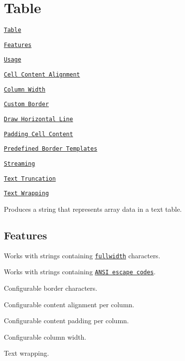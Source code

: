 \section*{Table}

\href{https://travis-ci.org/gajus/table}{\tt } \href{https://www.npmjs.com/package/table}{\tt } \href{https://github.com/gajus/canonical}{\tt }


\begin{DoxyItemize}
\item \href{#table}{\tt Table}
\begin{DoxyItemize}
\item \href{#table-features}{\tt Features}
\item \href{#table-usage}{\tt Usage}
\begin{DoxyItemize}
\item \href{#table-usage-cell-content-alignment}{\tt Cell Content Alignment}
\item \href{#table-usage-column-width}{\tt Column Width}
\item \href{#table-usage-custom-border}{\tt Custom Border}
\item \href{#table-usage-draw-horizontal-line}{\tt Draw Horizontal Line}
\item \href{#table-usage-padding-cell-content}{\tt Padding Cell Content}
\item \href{#table-usage-predefined-border-templates}{\tt Predefined Border Templates}
\item \href{#table-usage-streaming}{\tt Streaming}
\item \href{#table-usage-text-truncation}{\tt Text Truncation}
\item \href{#table-usage-text-wrapping}{\tt Text Wrapping}
\end{DoxyItemize}
\end{DoxyItemize}
\end{DoxyItemize}

Produces a string that represents array data in a text table.



\subsection*{Features}


\begin{DoxyItemize}
\item Works with strings containing \href{https://en.wikipedia.org/wiki/Halfwidth_and_fullwidth_forms}{\tt fullwidth} characters.
\item Works with strings containing \href{https://en.wikipedia.org/wiki/ANSI_escape_code}{\tt A\+N\+SI escape codes}.
\item Configurable border characters.
\item Configurable content alignment per column.
\item Configurable content padding per column.
\item Configurable column width.
\item Text wrapping.
\end{DoxyItemize}

